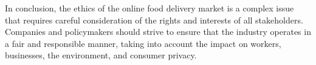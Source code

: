 \documentclass[10pt,twocolumn]{article}
\begin{document}
In conclusion, the ethics of the online food delivery market is a complex issue that requires careful consideration of the rights and interests of all stakeholders. Companies and policymakers should strive to ensure that the industry operates in a fair and responsible manner, taking into account the impact on workers, businesses, the environment, and consumer privacy.


\printbibliography
\end{document}
